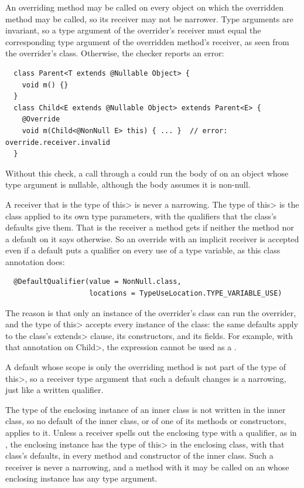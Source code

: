 An overriding method may be called on every object on which the overridden
method may be called, so its receiver may not be narrower.  Type arguments
are invariant, so a type argument of the overrider's receiver must equal the
corresponding type argument of the overridden method's receiver, as seen
from the overrider's class.  Otherwise, the checker reports an
 error:

\begin{Verbatim}
  class Parent<T extends @Nullable Object> {
    void m() {}
  }
  class Child<E extends @Nullable Object> extends Parent<E> {
    @Override
    void m(Child<@NonNull E> this) { ... }  // error: override.receiver.invalid
  }
\end{Verbatim}

\noindent
Without this check, a call through a  could
run the body of  on an object whose type argument is
nullable, although the body assumes it is non-null.

A receiver that is the type of \<this> is never a narrowing.  The type of
\<this> is the class applied to its own type parameters, with the
qualifiers that the class's defaults give them.  That is the receiver a
method gets if neither the method nor a default on it says otherwise.  So
an override with an implicit receiver is accepted even if a default puts a
qualifier on every use of a type variable, as this class annotation does:

\begin{Verbatim}
  @DefaultQualifier(value = NonNull.class,
                    locations = TypeUseLocation.TYPE_VARIABLE_USE)
\end{Verbatim}

\noindent
The reason is that only an instance of the overrider's class can run the
overrider, and the type of \<this> accepts every instance of the class:  the
same defaults apply to the class's \<extends> clause, its constructors, and
its fields.  For example, with that annotation on \<Child>, the expression
 cannot be used as a
.

A default whose scope is only the overriding method is not part of the type
of \<this>, so a receiver type argument that such a default changes is a
narrowing, just like a written qualifier.

The type of the enclosing instance of an inner class is not written in the
inner class, so no default of the inner class, or of one of its methods or
constructors, applies to it.  Unless a receiver spells out the enclosing
type with a qualifier, as in , the
enclosing instance has the type of \<this> in the enclosing class, with
that class's defaults, in every method and constructor of the inner class.
Such a receiver is never a narrowing, and a method with it may be called on
an  whose enclosing instance has any type argument.


